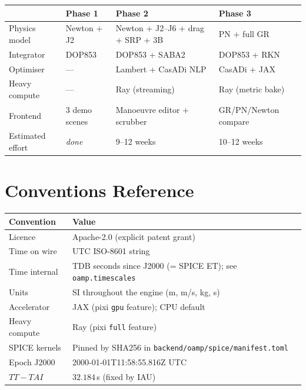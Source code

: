 \documentclass[11pt, a4paper]{article}
\begin{document}
\begin{center}
\begin{tabular}{L{4cm} C{2.5cm} C{2.5cm} C{2.5cm}}
  \toprule
  & \textbf{Phase 1} & \textbf{Phase 2} & \textbf{Phase 3} \\
  \midrule
  Physics model    & Newton + J2     & Newton + J2--J6 + drag + SRP + 3B
                                     & PN + full GR \\
  Integrator       & DOP853          & DOP853 + SABA2  & DOP853 + RKN \\
  Optimiser        & ---             & Lambert + CasADi NLP & CasADi + JAX \\
  Heavy compute    & ---             & Ray (streaming)  & Ray (metric bake) \\
  Frontend         & 3 demo scenes   & Manoeuvre editor + scrubber
                                     & GR/PN/Newton compare \\
  Estimated effort & \emph{done}     & 9--12 weeks     & 10--12 weeks \\
  \bottomrule
\end{tabular}
\end{center}

\section{Conventions Reference}

\begin{center}
\begin{tabularx}{\textwidth}{L{3cm} X}
  \toprule
  \textbf{Convention} & \textbf{Value} \\
  \midrule
  Licence        & Apache-2.0 (explicit patent grant) \\
  Time on wire   & UTC ISO-8601 string \\
  Time internal  & TDB seconds since J2000 (= SPICE ET); see \texttt{oamp.timescales} \\
  Units          & SI throughout the engine (m, m/s, kg, s) \\
  Accelerator    & JAX (pixi \texttt{gpu} feature); CPU default \\
  Heavy compute  & Ray (pixi \texttt{full} feature) \\
  SPICE kernels  & Pinned by SHA256 in \texttt{backend/oamp/spice/manifest.toml} \\
  Epoch J2000    & 2000-01-01T11:58:55.816Z UTC \\
  $TT - TAI$     & $32.184\,$s (fixed by IAU) \\
  \bottomrule
\end{tabularx}
\end{center}
\end{document}
